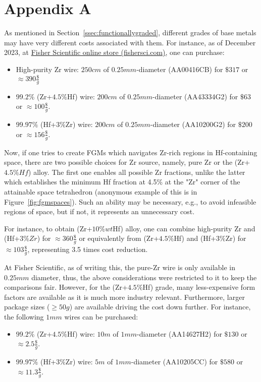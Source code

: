 \section{Appendix A} \label{app1}

As mentioned in Section~\ref{ssec:functionallygraded}, different grades of base metals may have very different costs associated with them. For instance, as of December 2023, at \href{https://www.fishersci.com}{Fisher Scientific online store (fishersci.com)}, one can purchase:
\begin{itemize}
    \item High-purity Zr wire: $250cm$ of $0.25mm$-diameter (AA00416CB) for $\$317$ or $\approx 390\frac{\$}{g}$
    \item $99.2\%$ (Zr+$4.5\%$Hf) wire: $200cm$ of $0.25mm$-diameter (AA43334G2) for $\$63$ or $\approx 100\frac{\$}{g}$. 
    \item $99.97\%$ (Hf+$3\%$Zr) wire: $200cm$ of $0.25mm$-diameter (AA10200G2) for $\$200$ or $\approx 156\frac{\$}{g}$. 
\end{itemize} 

Now, if one tries to create FGMs which navigates Zr-rich regions in Hf-containing space, there are two possible choices for Zr source, namely, pure Zr or the (Zr+$4.5\%Hf$) alloy. The first one enables all possible Zr fractions, unlike the latter which establishes the minimum Hf fraction at 4.5\% at the "Zr" corner of the attainable space tetrahedron (anonymous example of this is in Figure~\ref{fig:fgmspaces}). Such an ability may be necessary, e.g., to avoid infeasible regions of space, but if not, it represents an unnecessary cost. 

For instance, to obtain (Zr+$10\%wt$Hf) alloy, one can combine high-purity Zr and (Hf+$3\%Zr$) for $\approx 360\frac{\$}{g}$ or equivalently from (Zr+$4.5\%$Hf) and (Hf+$3\%$Zr) for $\approx 103\frac{\$}{g}$, representing 3.5 times cost reduction.

At Fisher Scientific, as of writing this, the pure-Zr wire is only available in $0.25mm$ diameter, thus, the above considerations were restricted to it to keep the comparisons fair. However, for the (Zr+$4.5\%$Hf) grade, many less-expensive form factors are available as it is much more industry relevant. Furthermore, larger package sizes ($\geq50g$) are available driving the cost down further. For instance, the following $1mm$ wires can be purchased:

\begin{itemize}
    \item $99.2\%$ (Zr+$4.5\%$Hf) wire: $10m$ of $1mm$-diameter  (AA14627H2) for $\$130$ or $\approx 2.5\frac{\$}{g}$. 
    \item $99.97\%$ (Hf+$3\%$Zr) wire: $5m$ of $1mm$-diameter (AA10205CC) for $\$580$ or $\approx 11.3\frac{\$}{g}$. 
\end{itemize}

